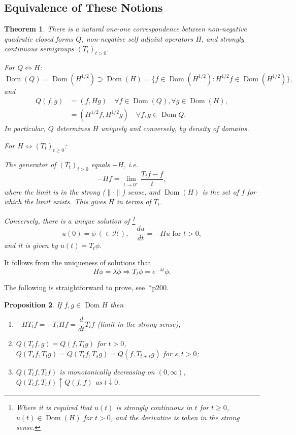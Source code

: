\documentclass[a4paper]{amsart}
\theoremstyle{plain}
\newtheorem{theorem}{Theorem}[section]
\newtheorem{proposition}[theorem]{Proposition}
\theoremstyle{definition}
\theoremstyle{remark}
\DeclareMathOperator{\dom}{Dom}
\begin{document}
\subsection{Equivalence of These Notions}
\begin{theorem}\label{equiv}
There is a natural one-one correspondence between non-negative quadratic closed forms $ Q $, non-negative self adjoint operators $ H $, and strongly continuous semigroups $ (T_t)_{t>0} $.

\medskip
For   $ Q \Longleftrightarrow H $:
\[
\dom(Q) = \dom(H^{1/2}) \supset \dom (H) = \{f\in \dom(H^{1/2}) : H^{1/2} f \in \dom(H^{1/2}) \},
\]
and
\begin{align*}
Q(f,g) &= (f,Hg) \quad \forall f \in \dom(Q) , \forall g \in \dom (H), \\
&= (H^{1/2}f, H^{1/2}g) \quad \forall f,g \in \dom Q.
\end{align*} 
In particular, $ Q $ determines $ H $ uniquely  and conversely, by density of domains.

\medskip For   $ H \Longleftrightarrow (T_t)_{t\geq 0} $: 

The generator of $ (T_t)_{t>0} $ equals $ -H $, i.e.
\[
-Hf = \lim_{t\to 0^+} \frac{T_tf - f}{t},
\]
where the limit is in the strong ($ \|\cdot\| $) sense, and $ \dom(H) $ is the set of $ f $ for which the limit exists.  This gives $ H $ in terms of $ T_t $.

Conversely, there is a unique solution of 
\footnote{Where it is required that $ u(t) $ is strongly continuous  in $ t $ for $t  \geq 0 $, $ u(t) \in \dom(H) $ for $ t>0 $, and the derivative is taken in the strong sense.} 
\[
u(0)= \phi\ (\in \mathcal{H}), \quad \frac{du}{dt} = - Hu \text{ for } t> 0 ,
\]
and it is given by $ u(t) = T_t \phi $.
\end{theorem}

It follows from the uniqueness of solutions that 
\[    H\phi = \lambda \phi \Longrightarrow  T_t\phi = e^{-\lambda t } \phi .\]

\medskip
The following is straightforward to prove, see~\cite{Kig}*{p200}.

\begin{proposition} If $ f,g \in \dom H $ then 
\begin{enumerate}

\item $ -HT_t f = -T_tH f  = \dfrac{d}{dt} T_tf$ (limit in the strong sense);
\item $ Q(T_tf,g ) = Q(f,T_t g)$ for $ t>0 $, $ Q(T_sf,T_tg) = Q(T_t f, T_s g) = Q(f,T_{t+s}g) $ for $ s,t>0 $;
\item $ Q(T_t f, T_t f) $ is monotonically decreasing on $ (0,\infty) $,  
$ Q(T_t f, T_t f) \uparrow Q(f,f) $ as $ t \downarrow 0   $.
\end{enumerate} 
\end{proposition} 
\end{document}
